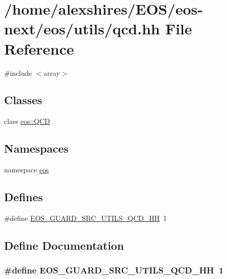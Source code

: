 \hypertarget{qcd_8hh}{
\section{/home/alexshires/EOS/eos-\/next/eos/utils/qcd.hh File Reference}
\label{qcd_8hh}
}
{\ttfamily \#include $<$array$>$}\par
\subsection*{Classes}
\begin{DoxyCompactItemize}
\item 
class \hyperlink{classeos_1_1QCD}{eos::QCD}
\end{DoxyCompactItemize}
\subsection*{Namespaces}
\begin{DoxyCompactItemize}
\item 
namespace \hyperlink{namespaceeos}{eos}
\end{DoxyCompactItemize}
\subsection*{Defines}
\begin{DoxyCompactItemize}
\item 
\#define \hyperlink{qcd_8hh_a3e93fae0351bb6b9ea4306536fab62e2}{EOS\_\-GUARD\_\-SRC\_\-UTILS\_\-QCD\_\-HH}~1
\end{DoxyCompactItemize}


\subsection{Define Documentation}
\hypertarget{qcd_8hh_a3e93fae0351bb6b9ea4306536fab62e2}{
\subsubsection[{EOS\_\-GUARD\_\-SRC\_\-UTILS\_\-QCD\_\-HH}]{\setlength{\rightskip}{0pt plus 5cm}\#define EOS\_\-GUARD\_\-SRC\_\-UTILS\_\-QCD\_\-HH~1}}
\label{qcd_8hh_a3e93fae0351bb6b9ea4306536fab62e2}
